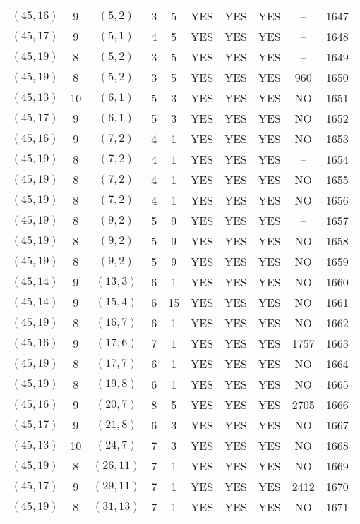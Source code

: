 \begin{longtable}{|c|c|c|c|c|c|c|c|c|c|}
$(45, 16)$ & 9 & $(5, 2)$ & 3 & 5 & YES & YES & YES & -- & 1647\\
$(45, 17)$ & 9 & $(5, 1)$ & 4 & 5 & YES & YES & YES & -- & 1648\\
$(45, 19)$ & 8 & $(5, 2)$ & 3 & 5 & YES & YES & YES & -- & 1649\\
$(45, 19)$ & 8 & $(5, 2)$ & 3 & 5 & YES & YES & YES & 960 & 1650\\
$(45, 13)$ & 10 & $(6, 1)$ & 5 & 3 & YES & YES & YES & NO & 1651\\
$(45, 17)$ & 9 & $(6, 1)$ & 5 & 3 & YES & YES & YES & NO & 1652\\
$(45, 16)$ & 9 & $(7, 2)$ & 4 & 1 & YES & YES & YES & NO & 1653\\
$(45, 19)$ & 8 & $(7, 2)$ & 4 & 1 & YES & YES & YES & -- & 1654\\
$(45, 19)$ & 8 & $(7, 2)$ & 4 & 1 & YES & YES & YES & NO & 1655\\
$(45, 19)$ & 8 & $(7, 2)$ & 4 & 1 & YES & YES & YES & NO & 1656\\
$(45, 19)$ & 8 & $(9, 2)$ & 5 & 9 & YES & YES & YES & -- & 1657\\
$(45, 19)$ & 8 & $(9, 2)$ & 5 & 9 & YES & YES & YES & NO & 1658\\
$(45, 19)$ & 8 & $(9, 2)$ & 5 & 9 & YES & YES & YES & NO & 1659\\
$(45, 14)$ & 9 & $(13, 3)$ & 6 & 1 & YES & YES & YES & NO & 1660\\
$(45, 14)$ & 9 & $(15, 4)$ & 6 & 15 & YES & YES & YES & NO & 1661\\
$(45, 19)$ & 8 & $(16, 7)$ & 6 & 1 & YES & YES & YES & NO & 1662\\
$(45, 16)$ & 9 & $(17, 6)$ & 7 & 1 & YES & YES & YES & 1757 & 1663\\
$(45, 19)$ & 8 & $(17, 7)$ & 6 & 1 & YES & YES & YES & NO & 1664\\
$(45, 19)$ & 8 & $(19, 8)$ & 6 & 1 & YES & YES & YES & NO & 1665\\
$(45, 16)$ & 9 & $(20, 7)$ & 8 & 5 & YES & YES & YES & 2705 & 1666\\
$(45, 17)$ & 9 & $(21, 8)$ & 6 & 3 & YES & YES & YES & NO & 1667\\
$(45, 13)$ & 10 & $(24, 7)$ & 7 & 3 & YES & YES & YES & NO & 1668\\
$(45, 19)$ & 8 & $(26, 11)$ & 7 & 1 & YES & YES & YES & NO & 1669\\
$(45, 17)$ & 9 & $(29, 11)$ & 7 & 1 & YES & YES & YES & 2412 & 1670\\
$(45, 19)$ & 8 & $(31, 13)$ & 7 & 1 & YES & YES & YES & NO & 1671\\

\end{longtable}
